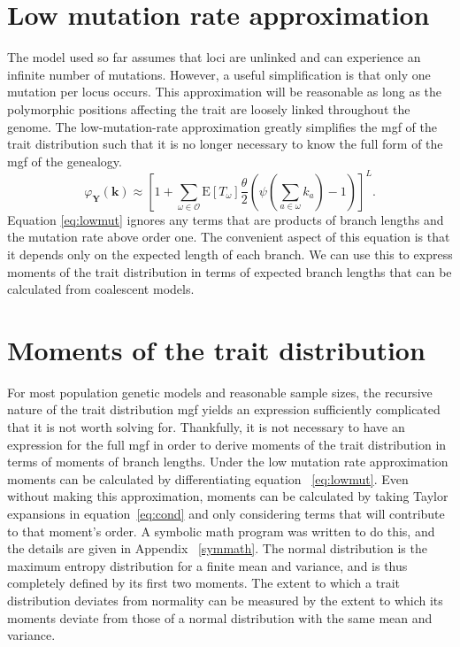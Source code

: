 \documentclass{article}
\newcommand{\T}{\frac{\theta}{2}}
\newcommand{\E}{\mathrm{E}}
\begin{document}
\section{Low mutation rate approximation}
The model used so far assumes that loci are unlinked and can experience an
infinite number of mutations. However, a useful simplification is that only one
mutation per locus occurs. This approximation will be reasonable as long as the
polymorphic positions affecting the trait are loosely linked throughout the
genome. The low-mutation-rate approximation greatly simplifies the mgf of the
trait distribution such that it is no longer necessary to know the full form of
the mgf of the genealogy.
\begin{equation}
\label{eq:lowmut}
\varphi_{\mathbf{Y}}(\mathbf{k}) \approx \left[ 1 + \sum_{\omega \in \mathcal{O}}
  \E[T_\omega] \T \left( \psi\left( \sum_{a \in \omega} k_a\right) -1 \right) \right]^L.
\end{equation}
Equation \eqref{eq:lowmut} ignores any terms that are products of branch lengths
and the mutation rate above order one. The convenient aspect of this equation is
that it depends only on the expected length of each branch. We can use this to
express moments
 of the trait distribution in terms of expected branch lengths
that can be calculated from coalescent models.
\section{Moments of the trait distribution}
For most population genetic models and reasonable sample sizes, the recursive
nature of the trait distribution mgf yields an expression sufficiently
complicated that it is not worth solving for. Thankfully, it is not necessary to
have an expression for the full mgf in order to derive moments of the trait
distribution in terms of moments of branch lengths. Under the low mutation rate
approximation moments can be calculated by differentiating equation
~\ref{eq:lowmut}. Even without making this approximation, moments can be
calculated by taking Taylor expansions in equation~\ref{eq:cond} and only
considering terms that will contribute to that moment's order. A symbolic math
program was written to do this, and the details are given in Appendix
~\ref{symmath}. The normal distribution is the maximum entropy distribution for
a finite mean and variance, and is thus completely defined by its first two
moments. The extent to which a trait distribution deviates from normality can be
measured by the extent to which its moments deviate from those of a normal
distribution with the same mean and variance.
\end{document}
